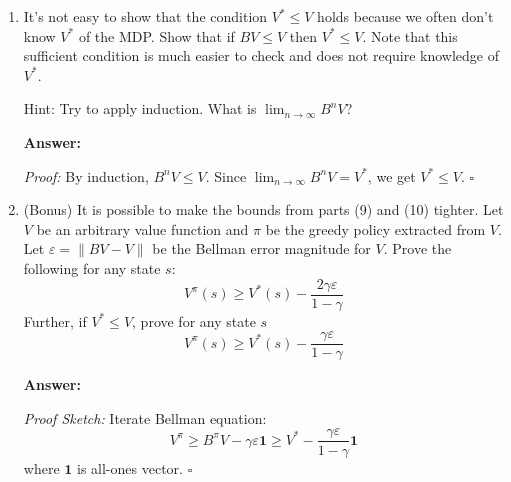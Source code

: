 \documentclass[12pt]{article}
\begin{document}
{{%

\begin{enumerate}[resume*]
    \item It’s not easy to show that the condition $V^{\ast} \leq V$ holds because we often don’t know $V^{\ast}$ of the MDP. Show that if $BV \leq V$ then $V^{\ast} \leq V$. Note that this sufficient condition is much easier
to check and does not require knowledge of $V^{\ast}$.

Hint: Try to apply induction. What is $\lim_{n \to \infty} B^nV$?


    \textbf{Answer:}
    
    \textit{Proof:} By induction, \(B^n V \leq V\). Since \(\lim_{n\to\infty} B^n V = V^*\), we get \(V^* \leq V\). \(\square\)

    
    \item (Bonus) It is possible to make the bounds from parts (9) and (10) tighter. Let $V$ be an arbitrary value function and $\pi$ be the greedy policy extracted from $V$. Let $\varepsilon = \|BV - V\|$ be the Bellman error magnitude for $V$. Prove the following for any state $s$:
    \[
    V^{\pi}(s) \geq V^{\ast}(s) - \frac{2\gamma \varepsilon}{1 - \gamma}
    \]
    Further, if $V^{\ast} \leq V$, prove for any state $s$
    \[
    V^{\pi}(s) \geq V^{\ast}(s) - \frac{\gamma \varepsilon}{1 - \gamma}
    \]


    \textbf{Answer:}
    
    \textit{Proof Sketch:} Iterate Bellman equation:
    \[
    V^\pi \geq B^\pi V - \gamma\varepsilon\mathbf{1} \geq V^* - \frac{\gamma\varepsilon}{1-\gamma}\mathbf{1}
    \]
    where \(\mathbf{1}\) is all-ones vector. \(\square\)
    
\end{enumerate}

\\





}}
\end{document}
